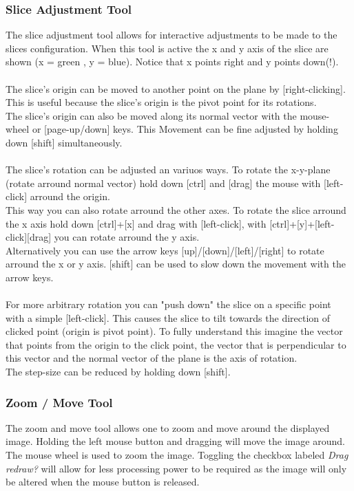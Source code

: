 \subsubsection{Slice Adjustment Tool}
The slice adjustment tool allows for interactive adjustments to be made to the slices configuration.
When this tool is active the x and y axis of the slice are shown (x = green , y = blue). Notice that x points
right and y points down(!).
\\ \\
The slice's origin can be moved to another point on the plane by [right-clicking]. This is useful because the slice's origin is the pivot point for its rotations.\\
The slice's origin can also be moved along its normal vector with the mouse-wheel or [page-up/down] keys. This
Movement can be fine adjusted by holding down [shift] simultaneously.
\\ \\
The slice's rotation can be adjusted an variuos ways.
To rotate the x-y-plane (rotate arround normal vector) hold down [ctrl] and [drag] the mouse with [left-click] arround the origin. \\
This way you can also rotate arround the other axes. To rotate the slice arround the x axis hold down [ctrl]+[x] and drag with [left-click], with [ctrl]+[y]+[left-click][drag] you can rotate arround the y axis. \\
Alternatively you can use the arrow keys [up]/[down]/[left]/[right] to rotate arround the x or y axis. [shift] can be used to slow down the movement with the arrow keys.
\\ \\
For more arbitrary rotation you can "push down" the slice on a specific point with a simple [left-click]. This causes the slice to tilt towards the direction of clicked point (origin is pivot point). To fully understand this imagine the vector that points from the origin to the click point, the vector that is perpendicular to this vector and the normal vector of the plane is the axis of rotation.\\
The step-size can be reduced by holding down [shift]. 

\subsubsection{Zoom / Move Tool}
The zoom and move tool allows one to zoom and move around the displayed image. Holding the left mouse button and dragging will move the image around. The mouse wheel is used to zoom the image. Toggling the checkbox labeled \textit{Drag redraw?} will allow for less processing power to be required as the image will only be altered when the mouse button is released.

